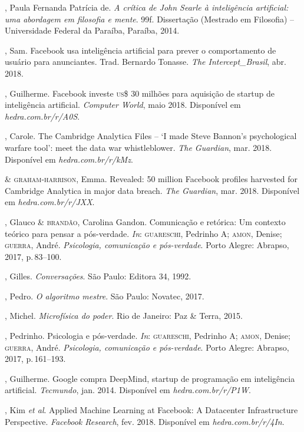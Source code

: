 \begin{bibliohedra}
, Paula Fernanda Patrícia de. \textit{A crítica de John Searle à
inteligência artificial: uma abordagem em filosofia e mente}. 99f. Dissertação (Mestrado em Filosofia) -- Universidade Federal da Paraíba, Paraíba, 2014.

, Sam. Facebook usa inteligência artificial para prever o
comportamento de usuário para anunciantes. Trad. Bernardo
Tonasse. \textit{The Intercept\_Brasil}, abr. 2018.

, Guilherme. Facebook investe \textsc{us}\$ 30 milhões para
aquisição de startup de inteligência artificial. \textit{Computer World}, maio 2018. Disponível em \textit{hedra.com.br/r/A0S}.

, Carole. The Cambridge Analytica Files -- `I made
Steve Bannon's psychological warfare tool': meet the data war
whistleblower. \textit{The Guardian}, mar. 2018. Disponível em \textit{hedra.com.br/r/kMz}.

\titidem\mbox{} \& \textsc{graham-harrison}, Emma. Revealed: 50 million
Facebook profiles harvested for Cambridge Analytica in major data
breach. \textit{The Guardian}, mar. 2018. Disponível em \textit{hedra.com.br/r/JXX}.

, Glauco \& \textsc{brandão}, Carolina Gandon. Comunicação e
retórica: Um contexto teórico para pensar a pós-verdade. \textit{In}:
\textsc{guareschi}, Pedrinho A; \textsc{amon}, Denise; \textsc{guerra}, André. \textit{Psicologia, comunicação e pós-verdade}. Porto Alegre: Abrapso, 2017, p.\,83--100.

, Gilles. \textit{Conversações}. São Paulo: Editora 34, 1992.

, Pedro. \textit{O algoritmo mestre}. São Paulo: Novatec, 2017.

, Michel. \textit{Microfísica do poder}. Rio de Janeiro: Paz \&
Terra, 2015.

, Pedrinho. Psicologia e pós-verdade. \textit{In}:
\textsc{guareschi}, Pedrinho A; \textsc{amon}, Denise; \textsc{guerra}, André. \textit{Psicologia, comunicação e pós-verdade}. Porto Alegre: Abrapso, 2017, p.\,161--193.

, Guilherme. Google compra DeepMind, startup de programação
em inteligência artificial. \textit{Tecmundo}, jan. 2014. Disponível em \textit{hedra.com.br/r/P1W}.

, Kim \textit{et al}. Applied Machine Learning at Facebook: A
Datacenter Infrastructure Perspective. \textit{Facebook Research}, fev. 2018. Disponível em \textit{hedra.com.br/r/4In}.


\end{bibliohedra}
